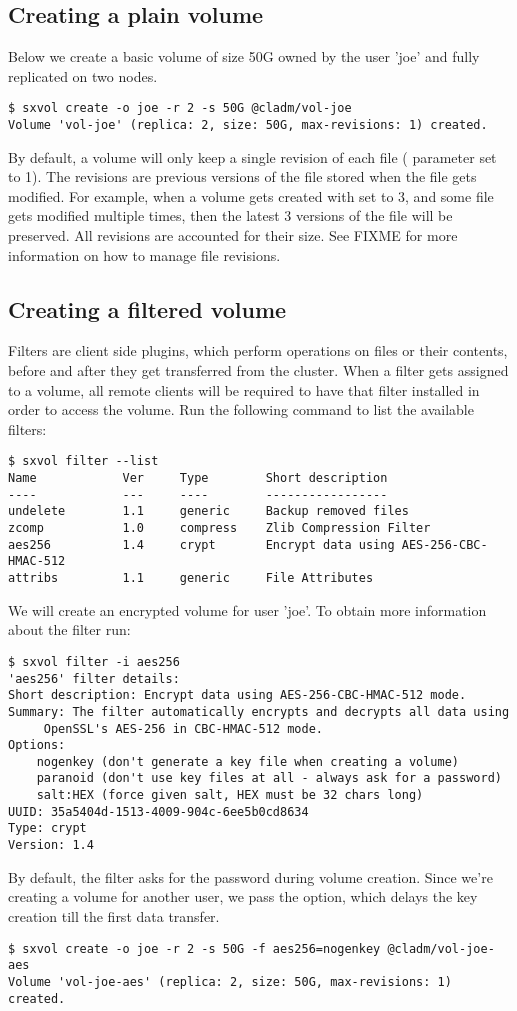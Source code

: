 \subsection{Creating a plain volume}
Below we create a basic volume of size 50G owned by the user 'joe' and fully replicated on two nodes.
\begin{lstlisting}
$ sxvol create -o joe -r 2 -s 50G @cladm/vol-joe
Volume 'vol-joe' (replica: 2, size: 50G, max-revisions: 1) created.
\end{lstlisting}
By default, a volume will only keep a single revision of each file (
parameter set to 1). The revisions are previous versions of the file stored when the file
gets modified. For example, when a volume gets created with  set to
3, and some file gets modified multiple times, then the latest 3 versions of the file will
be preserved. All revisions are accounted for their size. See FIXME for more information on
how to manage file revisions.

\subsection{Creating a filtered volume}
Filters are client side plugins, which perform operations on files or their contents, before
and after they get transferred from the \SX cluster. When a filter gets assigned to a volume,
all remote clients will be required to have that filter installed in order to access the volume.
Run the following command to list the available filters:
\begin{lstlisting}
$ sxvol filter --list
Name            Ver     Type        Short description
----            ---     ----        -----------------
undelete        1.1     generic     Backup removed files
zcomp           1.0     compress    Zlib Compression Filter
aes256          1.4     crypt	    Encrypt data using AES-256-CBC-HMAC-512
attribs         1.1     generic     File Attributes
\end{lstlisting}
We will create an encrypted volume for user 'joe'. To obtain more information
about the  filter run:
\begin{lstlisting}
$ sxvol filter -i aes256
'aes256' filter details:
Short description: Encrypt data using AES-256-CBC-HMAC-512 mode.
Summary: The filter automatically encrypts and decrypts all data using
	 OpenSSL's AES-256 in CBC-HMAC-512 mode.
Options: 
	nogenkey (don't generate a key file when creating a volume)
	paranoid (don't use key files at all - always ask for a password)
	salt:HEX (force given salt, HEX must be 32 chars long)
UUID: 35a5404d-1513-4009-904c-6ee5b0cd8634
Type: crypt
Version: 1.4
\end{lstlisting}
By default, the  filter asks for the password during volume
creation. Since we're creating a volume for another user, we pass the
 option, which delays the key creation till the first data
transfer.
\begin{lstlisting}
$ sxvol create -o joe -r 2 -s 50G -f aes256=nogenkey @cladm/vol-joe-aes
Volume 'vol-joe-aes' (replica: 2, size: 50G, max-revisions: 1) created.
\end{lstlisting}


